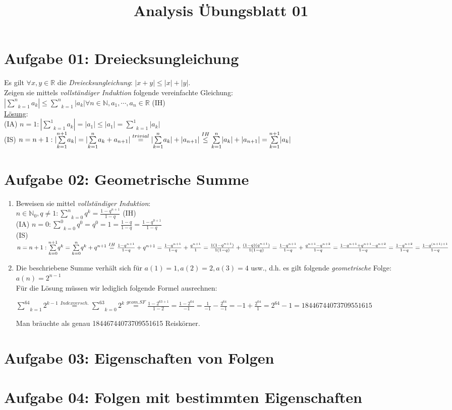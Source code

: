 \documentclass[a4paper,11pt]{article}
\title{Analysis Übungsblatt 01}
\begin{document}
\maketitle

\section{Aufgabe 01: Dreiecksungleichung}
Es gilt $\forall x,y\in\mathbb{R}$ die \emph{Dreiecksungleichung}: $|x+y|\leq|x|+|y|$.\\
Zeigen sie mittels \emph{vollständiger Induktion} folgende vereinfachte Gleichung:\\
$|\underset{k=1}{\overset{n}{\sum}}a_k|\leq\underset{k=1}{\overset{n}{\sum}}|a_k|\forall n\in\mathbb{N},a_1,\cdots,a_n\in\mathbb{R}$ (IH)\\
\underline{Lösung}:\\
(IA) $n=1: |\underset{k=1}{\overset{1}{\sum}}a_k|=|a_1|\leq|a_1|=\underset{k=1}{\overset{1}{\sum}}|a_k|$\\
(IS) $n=n+1:|\underset{k=1}{\overset{n+1}{\sum}}a_k|=|\underset{k=1}{\overset{n}{\sum}}a_k+a_{n+1}|\overset{trivial}{=}|\underset{k=1}{\overset{n}{\sum}}a_k|+|a_{n+1}|\\
\overset{IH}{\leq}\underset{k=1}{\overset{n}{\sum}}|a_k|+|a_{n+1}|=\underset{k=1}{\overset{n+1}{\sum}}|a_k|$
\section{Aufgabe 02: Geometrische Summe}
\begin{enumerate}[label={\alph*)}]
	\item Beweisen sie mittel \emph{vollständiger Induktion}:\\
		$n\in\mathbb{N}_0,q\neq1:\underset{k=0}{\overset{n}{\sum}}q^k=\frac{1-q^{n+1}}{1-q}$ (IH)\\
		(IA) $n=0:\underset{k=0}{\overset{0}{\sum}}q^0=q^0=1=\frac{1-q}{1-q}=\frac{1-q^{0+1}}{1-q}$\\
		(IS) $n=n+1:\underset{k=0}{\overset{n+1}{\sum}}q^k=\underset{k=0}{\overset{n}{\sum}}q^k+q^{n+1}\overset{IH}{=}\frac{1-q^{n+1}}{1-q}+q^{n+1}\\
		=\frac{1-q^{n+1}}{1-q}+\frac{q^{n+1}}{1}=\frac{1(1-q^{n+1})}{1(1-q)}+\frac{(1-q)(q^{n+1})}{1(1-q)}\\
		=\frac{1-q^{n+1}}{1-q}+\frac{q^{n+1}-q^{n+2}}{1-q}=\frac{1-q^{n+1}+q^{n+1}-q^{n+2}}{1-q}=\frac{1-q^{n+2}}{1-q}=\frac{1-q^{(n+1)+1}}{1-q}$
	\item Die beschriebene Summe verhält sich für $a(1)=1, a(2)=2, a(3)=4$ usw., d.h. es gilt folgende \emph{geometrische} Folge: $a(n)=2^{n-1}$\\
		Für die Lösung müssen wir lediglich folgende Formel ausrechnen:

		$\underset{k=1}{\overset{64}{\sum}}2^{k-1}\overset{Indexversch.}{=}\underset{k=0}{\overset{63}{\sum}}2^k\overset{geom. SF}{=}\frac{1-2^{63+1}}{1-2}=\frac{1-2^{64}}{-1}=\frac{1}{-1}-\frac{2^{64}}{-1}= -1+\frac{2^{64}}{1}=2^{64}-1=18446744073709551615$

		Man bräuchte als genau 18446744073709551615 Reiskörner.
\end{enumerate}
\section{Aufgabe 03: Eigenschaften von Folgen}
\section{Aufgabe 04: Folgen mit bestimmten Eigenschaften}
\end{document}
